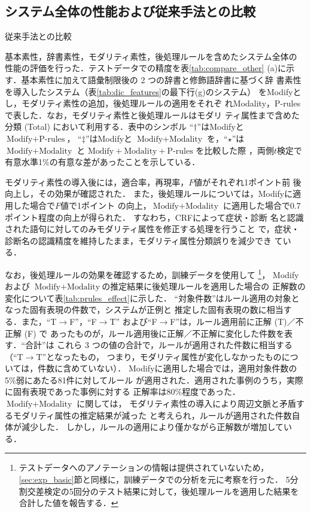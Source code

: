 \documentclass[japanese]{jnlp_1.4}
\begin{document}
\subsection{システム全体の性能および従来手法との比較}

\begin{table}[b]
\caption{従来手法との比較}
\label{tab:compare_other}

\end{table}

基本素性，辞書素性，モダリティ素性，後処理ルールを含めたシステム全体の
性能の評価を行った．テストデータでの精度を表\ref{tab:compare_other}
(a)に示す．基本素性に加えて語彙制限後の 2 つの辞書と修飾語辞書に基づく辞
書素性を導入したシステム（表\ref{tab:dic_features}の最下行(g)のシステム）
をModifyとし，モダリティ素性の追加，後処理ルールの適用をそれぞ
れModality，P-rulesで表した．なお，モダリティ素性と後処理ルールはモダリ
ティ属性まで含めた分類 (Total) において利用する．表中のシンボル
``$\dagger$''はModifyと $\text{Modify}+\text{P-rules}$，
``$\ddagger$''はModifyと $\text{Modify}+\text{Modality}$ を，``$\star$''は
$\text{Modify}+\text{Modality}$ と $\text{Modify}+\text{Modality}+\text{P-rules}$ を比較した際
，両側$t$検定で有意水準1\%の有意な差があったことを示している．

モダリティ素性の導入後には，適合率，再現率，$F$値がそれぞれ1ポイント前
後向上し，その効果が確認された．
また，後処理ルールについては，Modifyに適用した場合で$F$値で1ポイント
の向上，$\text{Modify}+\text{Modality}$ に適用した場合で0.7ポイント程度の向上が得られた．
すなわち，CRFによって症状・診断
名と認識された語句に対してのみモダリティ属性を修正する処理を行うこと
で，症状・診断名の認識精度を維持したまま，モダリティ属性分類誤りを減少でき
ている．

なお，後処理ルールの効果を確認するため，訓練データを使用して
\footnote{テストデータへのアノテーションの情報は提供されていないため，
\ref{sec:exp_basic}節と同様に，訓練データでの分析を元に考察を行った．
5分割交差検定の5回分のテスト結果に対して，後処理ルールを適用した結果を
合計した値を報告する．}，
Modify および $\text{Modify}+\text{Modality}$の推定結果に後処理ルールを適用した場合の
正解数の変化について表\ref{tab:prules_effect}に示した．
\mbox{``対}象件\mbox{数''}はルール適用の対象となった固有表現の件数で，システムが正例と
推定した固有表現の数に相当する．また，``T$\rightarrow$F''，``F$\rightarrow$T''
および``F$\rightarrow$F''は，ルール適用前に正解 (T)／不正解 (F) で
あったものが，ルール適用後に正解／不正解に変化した件数を表す．``合計''は
これら 3 つの値の合計で，ルールが適用された件数に相当する
（``T$\rightarrow$T''となったもの，
つまり，モダリティ属性が変化しなかったものについては，件数に含めていない）．
Modifyに適用した場合では，適用対象件数の5\%弱にあたる81件に対してルール
が適用された．適用された事例のうち，実際に固有表現であった事例に対する
正解率は80\%程度であった．$\text{Modify}+\text{Modality}$ に関しては，
モダリティ素性の導入により周辺文脈と矛盾するモダリティ属性の推定結果が減った
と考えられ，ルールが適用された件数自体が減少した．
しかし，ルールの適用により僅かながら正解数が増加している．
\end{document}
